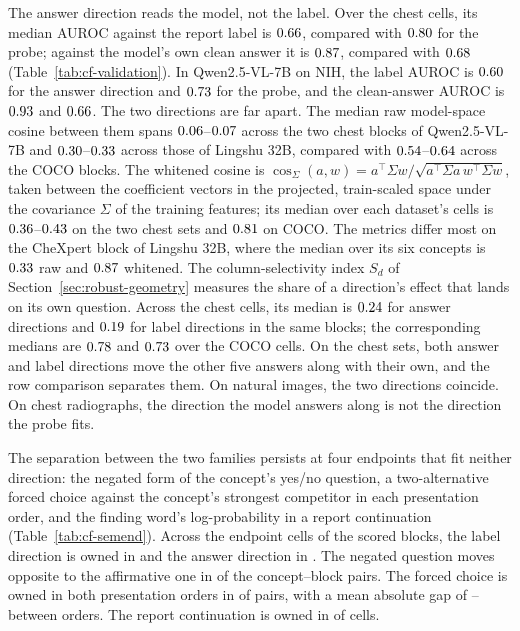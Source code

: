 The answer direction reads the model, not the label. Over the \cfValAurocAnsChestN{} chest cells, its median AUROC against the report label is $0.66$, compared with $0.80$ for the probe; against the model's own clean answer it is $0.87$, compared with $0.68$ (Table~\ref{tab:cf-validation}). In Qwen2.5-VL-7B on NIH, the label AUROC is $0.60$ for the answer direction and $0.73$ for the probe, and the clean-answer AUROC is $0.93$ and $0.66$. The two directions are far apart. The median raw model-space cosine between them spans $0.06$--$0.07$ across the two chest blocks of Qwen2.5-VL-7B and $0.30$--$0.33$ across those of Lingshu 32B, compared with $0.54$--$0.64$ across the COCO blocks. The whitened cosine is $\cos_\Sigma(a,w)=a^{\top}\Sigma w/\sqrt{a^{\top}\Sigma a\,w^{\top}\Sigma w}$, taken between the coefficient vectors in the projected, train-scaled space under the covariance $\Sigma$ of the training features; its median over each dataset's cells is $0.36$--$0.43$ on the two chest sets and $0.81$ on COCO. The metrics differ most on the CheXpert block of Lingshu 32B, where the median over its six concepts is $0.33$ raw and $0.87$ whitened. The column-selectivity index $S_d$ of Section~\ref{sec:robust-geometry} measures the share of a direction's effect that lands on its own question. Across the \cfAnsColSelChestN{} chest cells, its median is $0.24$ for answer directions and $0.19$ for label directions in the same blocks; the corresponding medians are $0.78$ and $0.73$ over the \cfAnsColSelCocoN{} COCO cells. On the chest sets, both answer and label directions move the other five answers along with their own, and the row comparison separates them. On natural images, the two directions coincide. On chest radiographs, the direction the model answers along is not the direction the probe fits.

The separation between the two families persists at four endpoints that fit neither direction: the negated form of the concept's yes/no question, a two-alternative forced choice against the concept's strongest competitor in each presentation order, and the finding word's log-probability in a report continuation (Table~\ref{tab:cf-semend}). Across the \cfSemCells{} endpoint cells of the \cfSemBlocks{} scored blocks, the label direction is owned in \cfSemLabelOwned{} and the answer direction in \cfSemAnswerOwned{}. The negated question moves opposite to the affirmative one in \cfSemNegOpposite{} of the \cfSemNegN{} concept--block pairs. The forced choice is owned in both presentation orders in \cfSemForcedOwned{} of \cfSemForcedN{} pairs, with a mean absolute gap of \cfSemGapMin{}--\cfSemGapMax{} between orders. The report continuation is owned in \cfSemReportOwned{} of \cfSemReportCells{} cells.

